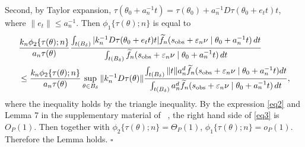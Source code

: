 \documentclass[9pt]{article}
\theoremstyle{remark}
\begin{document}
	Second, by Taylor expansion, $\tau(\theta_0+a_{n}^{-1}t)=\tau(\theta_0)+a_{n}^{-1}D\tau(\theta_0+e_{t}t)t$,
	where $\|e_{t}\|\leq a_{n}^{-1}$. Then $\phi_{1}\{\tau(\theta);n\}$ is equal to
	\begin{eqnarray}
    &\frac{k_{n}\phi_{2}\{\tau(\theta);n\}}{a_{n}\tau(\theta)}\frac{\int_{t(B_{\delta})}|k_{n}^{-1}D\tau(\theta_0+e_{t}t)t|\widetilde{f}_{n}(s_{{\rm obs}}+\varepsilon_{n}\nu\mid\theta_0+a_{n}^{-1}t)\,dt}{\int_{t(B_{\delta})}\widetilde{f}_{n}(s_{{\rm obs}}+\varepsilon_{n}\nu\mid\theta_0+a_{n}^{-1}t)\,dt}\nonumber \\
	& \leq  \frac{k_{n}\phi_{2}\{\tau(\theta);n\}}{a_{n}\tau(\theta)}\sup_{\theta\in B_{\delta}}\|k_{n}^{-1}D\tau(\theta)\|\frac{\int_{t(B_{\delta})}\|t\|a_{n}^{d}\widetilde{f}_{n}(s_{{\rm obs}}+\varepsilon_{n}\nu\mid\theta_0+a_{n}^{-1}t)dt}{\int_{t(B_{\delta})}a_{n}^{d}\widetilde{f}_{n}(s_{{\rm obs}}+\varepsilon_{n}\nu\mid\theta_0+a_{n}^{-1}t)\,dt},\label{eq3}
	\end{eqnarray}
	where the inequality holds by the triangle inequality. By the expression
	\eqref{eq2} and Lemma 7 in the supplementary material of ~\cite{Li2016},
	the right hand side of \eqref{eq3} is $O_{P}(1)$. Then together
	with $\phi_{2}\{\tau(\theta);n\}=\Theta_{P}(1)$, $\phi_{1}\{\tau(\theta);n\}=o_{P}(1).$
	Therefore the Lemma holds.
	\hfill{$\square$} 

\pagebreak 
\end{document}

